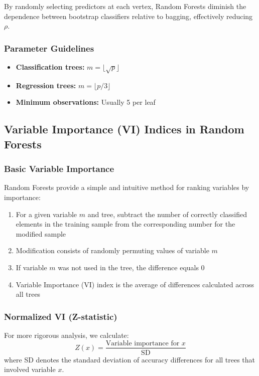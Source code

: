 \documentclass[12pt,a4paper]{article}
\begin{document}
By randomly selecting predictors at each vertex, Random Forests diminish the dependence between bootstrap classifiers relative to bagging, effectively reducing $\rho$.

\subsubsection{Parameter Guidelines}
\begin{itemize}
    \item \textbf{Classification trees:} $m = \lfloor\sqrt{p}\rfloor$
    \item \textbf{Regression trees:} $m = \lfloor p/3 \rfloor$
    \item \textbf{Minimum observations:} Usually 5 per leaf
\end{itemize}

\subsection{Variable Importance (VI) Indices in Random Forests}

\subsubsection{Basic Variable Importance}
Random Forests provide a simple and intuitive method for ranking variables by importance:

\begin{enumerate}
    \item For a given variable $m$ and tree, subtract the number of correctly classified elements in the training sample from the corresponding number for the modified sample
    \item Modification consists of randomly permuting values of variable $m$
    \item If variable $m$ was not used in the tree, the difference equals 0
    \item Variable Importance (VI) index is the average of differences calculated across all trees
\end{enumerate}

\subsubsection{Normalized VI (Z-statistic)}
For more rigorous analysis, we calculate:
\begin{equation}
Z(x) = \frac{\text{Variable importance for } x}{\text{SD}}
\end{equation}
where SD denotes the standard deviation of accuracy differences for all trees that involved variable $x$.
\end{document}

